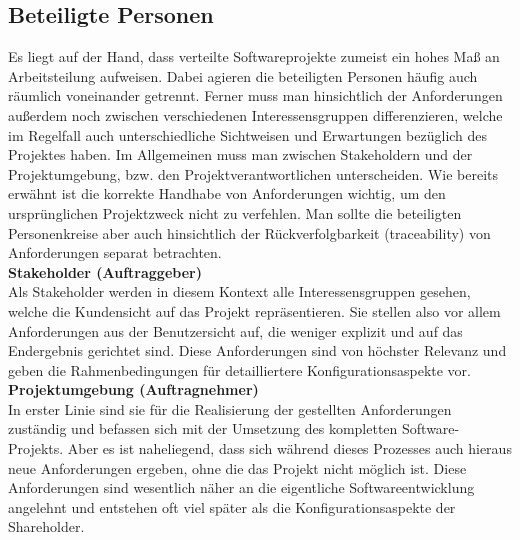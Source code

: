 \subsection{Beteiligte Personen}
Es liegt auf der Hand, dass verteilte Softwareprojekte zumeist ein hohes Maß an Arbeitsteilung aufweisen. Dabei agieren die beteiligten Personen häufig auch räumlich voneinander getrennt. Ferner muss man hinsichtlich der Anforderungen außerdem noch zwischen verschiedenen Interessensgruppen differenzieren, welche im Regelfall auch unterschiedliche Sichtweisen und Erwartungen bezüglich des Projektes haben. Im Allgemeinen muss man zwischen Stakeholdern und der Projektumgebung, bzw. den Projektverantwortlichen unterscheiden. Wie bereits erwähnt ist die korrekte Handhabe von Anforderungen wichtig, um den ursprünglichen Projektzweck nicht zu verfehlen. Man sollte die beteiligten Personenkreise aber auch hinsichtlich der Rückverfolgbarkeit (traceability) von Anforderungen separat betrachten.
\\
\textbf{Stakeholder (Auftraggeber)}
\\
Als Stakeholder werden in diesem Kontext alle Interessensgruppen gesehen, welche die Kundensicht auf das Projekt repräsentieren. Sie stellen also vor allem Anforderungen aus der Benutzersicht auf, die weniger explizit und auf das Endergebnis gerichtet sind. Diese Anforderungen sind von höchster Relevanz und geben die Rahmenbedingungen für detailliertere Konfigurationsaspekte vor. 
\\
\textbf{Projektumgebung (Auftragnehmer)}
\\
In erster Linie sind sie für die Realisierung der gestellten Anforderungen zuständig und befassen sich mit der Umsetzung des kompletten Software-Projekts. Aber es ist naheliegend, dass sich während dieses Prozesses auch hieraus neue Anforderungen ergeben, ohne die das Projekt nicht möglich ist. Diese Anforderungen sind wesentlich näher an die eigentliche Softwareentwicklung angelehnt und entstehen oft viel später als die Konfigurationsaspekte der Shareholder.
